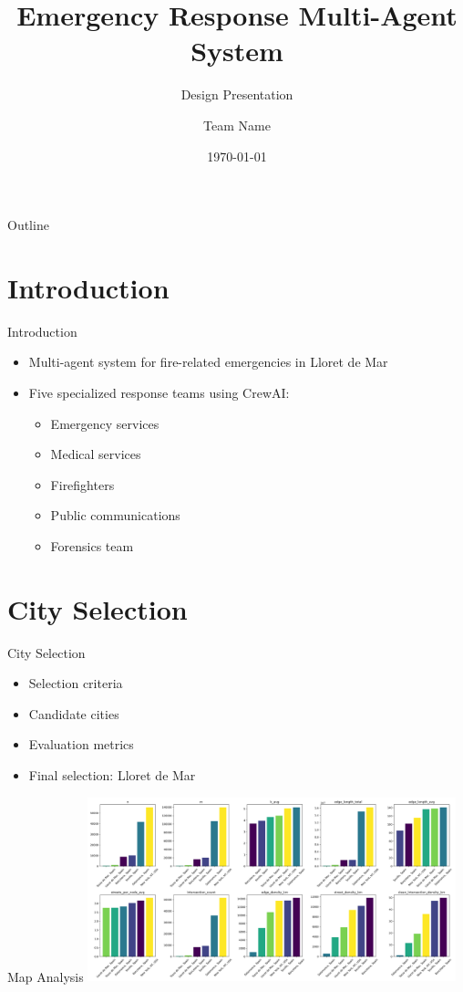 \documentclass{beamer}
\title{Emergency Response Multi-Agent System}
\subtitle{Design Presentation}
\author{Team Name}
\date{\today}
\begin{document}
\begin{frame}
    \titlepage
\end{frame}

\begin{frame}{Outline}
    \tableofcontents
\end{frame}

\section{Introduction}
\begin{frame}{Introduction}
    \begin{itemize}
        \item Multi-agent system for fire-related emergencies in Lloret de Mar
        \item Five specialized response teams using CrewAI:
        \begin{itemize}
            \item Emergency services
            \item Medical services
            \item Firefighters
            \item Public communications
            \item Forensics team
        \end{itemize}
    \end{itemize}
\end{frame}

\section{City Selection}
\begin{frame}{City Selection}
    \begin{itemize}
        \item Selection criteria
        \item Candidate cities
        \item Evaluation metrics
        \item Final selection: Lloret de Mar
    \end{itemize}
\end{frame}

\begin{frame}{Map Analysis}
    \includegraphics[width=0.8\textwidth]{../figures/map_complexity_statistics.png}
\end{frame}
\end{document}
